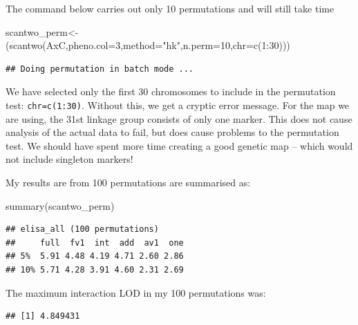 \documentclass[
]{book}
\newenvironment{Shaded}{\begin{snugshade}}{\end{snugshade}}
\newcommand{\AttributeTok}[1]{\textcolor[rgb]{0.77,0.63,0.00}{#1}}
\newcommand{\DecValTok}[1]{\textcolor[rgb]{0.00,0.00,0.81}{#1}}
\newcommand{\FunctionTok}[1]{\textcolor[rgb]{0.00,0.00,0.00}{#1}}
\newcommand{\NormalTok}[1]{#1}
\newcommand{\OtherTok}[1]{\textcolor[rgb]{0.56,0.35,0.01}{#1}}
\newcommand{\SpecialCharTok}[1]{\textcolor[rgb]{0.00,0.00,0.00}{#1}}
\newcommand{\StringTok}[1]{\textcolor[rgb]{0.31,0.60,0.02}{#1}}
\begin{document}
The command below carries out only 10 permutations and will still take time

\begin{Shaded}
\begin{Highlighting}[]
\NormalTok{scantwo\_perm}\OtherTok{\textless{}{-}}\NormalTok{(}\FunctionTok{scantwo}\NormalTok{(AxC,}\AttributeTok{pheno.col=}\DecValTok{3}\NormalTok{,}\AttributeTok{method=}\StringTok{"hk"}\NormalTok{,}\AttributeTok{n.perm=}\DecValTok{10}\NormalTok{,}\AttributeTok{chr=}\FunctionTok{c}\NormalTok{(}\DecValTok{1}\SpecialCharTok{:}\DecValTok{30}\NormalTok{))) }
\end{Highlighting}
\end{Shaded}

\begin{verbatim}
## Doing permutation in batch mode ...
\end{verbatim}

We have selected only the first 30 chromosomes to include in the permutation test: \texttt{chr=c(1:30)}. Without this, we get a cryptic error message. For the map we are using, the 31st linkage group consists of only one marker. This does not cause analysis of the actual data to fail, but does cause problems to the permutation test. We should have spent more time creating a good genetic map -- which would not include singleton markers!

My results are from 100 permutations are summarised as:

\begin{Shaded}
\begin{Highlighting}[]
\FunctionTok{summary}\NormalTok{(scantwo\_perm)}
\end{Highlighting}
\end{Shaded}

\begin{verbatim}
## elisa_all (100 permutations)
##     full  fv1  int  add  av1  one
## 5%  5.91 4.48 4.19 4.71 2.60 2.86
## 10% 5.71 4.28 3.91 4.60 2.31 2.69
\end{verbatim}

The maximum interaction LOD in my 100 permutations was:

\begin{Shaded}
\end{Shaded}

\begin{verbatim}
## [1] 4.849431
\end{verbatim}
\end{document}
